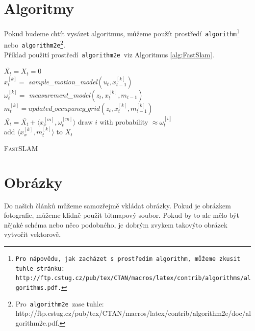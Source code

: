 \documentclass[a4paper, 11pt]{article}
\begin{document}
	
	\section{Algoritmy}
	\label{sec:Algoritmy}
	Pokud budeme chtít vysázet algoritmus, můžeme použít prostředí\texttt{ algorithm\footnote{Pro nápovědu, jak zacházet s prostředím\texttt{ algorithm,} můžeme zkusit tuhle stránku:\\ http://ftp.cstug.cz/pub/tex/CTAN/macros/latex/contrib/algorithms/algorithms.pdf.} }nebo\texttt{ algorithm2e}\footnote{Pro\texttt{ algorithm2e }zase tuhle: http://ftp.cstug.cz/pub/tex/CTAN/macros/latex/contrib/algorithm2e/doc/algorithm2e.pdf.}.\\
	Příklad použití prostředí\texttt{ algorithm2e }viz Algoritmus \ref{alg:FastSlam}.
	
	\begin{algorithm}[h]
		\label{alg:FastSlam}
		\SetNlSty{}{}{:  }
		\SetInd{1em}{0.8em}
		\SetNlSkip{-1.3em}
		\BlankLine
		\Indp \Indp
			$\overline{X_t} = X_t = 0$\\
			{$x_t^{[k]} =$ \emph{sample\_motion\_model}$(u_t,x_{t-1}^{[k]})$\\
			$\omega_t^{[k]} =$ \emph{measurement\_model}$(z_t,x_t^{[k]},m_{t-1})$\\
			$m_t^{[k]} = updated\_occupancy\_grid(z_t,x_t^{[k]},m_{t-1}^{[k]})$\\
			$\overline{X_t} = \overline{X_t} + \langle x_x^{[m]},\omega_t^{[m]}\rangle$}
			{draw $i$ with probability $\approx \omega_t^{[i]}$\\
			add $\langle x_x^{[k]},m_t^{[k]}\rangle$ to $X_t$\\}
		\caption{\textsc{Fast}SLAM}
	\end{algorithm}

	\section{Obrázky}
	Do našich článků můžeme samozřejmě vkládat obrázky. Pokud je obrázkem fotografie,
	můžeme klidně použít bitmapový soubor. Pokud by to ale mělo být nějaké schéma nebo
	něco podobného, je dobrým zvykem takovýto obrázek vytvořit vektorově.
	
\end{document}
